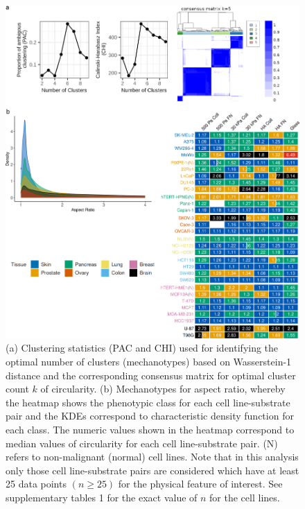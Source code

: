 \documentclass[11pt,letterpaper,english,oneside]{article} %
\begin{document}
\begin{figure}[H]
    \centering
    \includegraphics{../Figures/Supplementary_Figure12/supplementary_figure12.png}
    \caption{(a) Clustering statistics (PAC and CHI) used for identifying the optimal number of clusters (mechanotypes) based on Wasserstein-1 distance and the corresponding consensus matrix for optimal cluster count $k$
    of circularity. (b) Mechanotypes for aspect ratio, whereby the heatmap shows the phenotypic class for each cell line-substrate pair and the KDEs correspond to characteristic density function for each class. 
    The numeric values shown in the heatmap correspond to median values of circularity for each cell line-substrate pair. (N) refers to non-malignant (normal) cell lines. 
    Note that in this analysis only those cell line-substrate pairs are considered which have at least 25 data points $(n \geq 25)$ for the physical feature of interest.
    See supplementary tables 1 for the exact value of $n$ for the cell lines.}
    \label{fig:fig12}
\end{figure}
\end{document}
